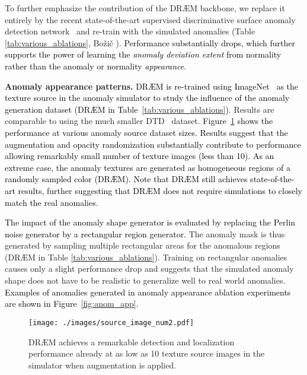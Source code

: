 \documentclass[10pt,twocolumn,letterpaper]{article}
\newcommand\ntxt[1]{\textcolor{black}{#1}}
\newcommand\ntext[1]{\textcolor{black}{#1}}
\begin{document}
To further emphasize the contribution of the DR{\AE}M backbone, we replace it entirely by the recent state-of-the-art supervised discriminative surface anomaly detection network~\cite{bozic2020end} and re-train with the simulated anomalies (Table \ref{tab:various_ablations}, Bo\v{z}i\v{c} \etal). \ntext{Performance substantially drops, which further supports the power of learning the \textit{anomaly deviation extent} from normality rather than the anomaly or normality \textit{appearance}.}





\textbf{Anomaly appearance patterns.} 
\ntext{DR{\AE}M is re-trained using ImageNet~\cite{deng2009imagenet} as the texture source in the anomaly simulator to study the influence of the anomaly generation dataset (DR{\AE}M in Table~\ref{tab:various_ablations}).} 
Results are comparable to using the much smaller DTD~\cite{cimpoi2014describing} dataset. \ntxt{Figure~\ref{fig:src_num} shows the performance at various anomaly source dataset sizes. Results suggest that the augmentation and opacity randomization substantially contribute to performance allowing remarkably small number of texture images (less than 10).} \ntext{As an extreme case, the anomaly textures are generated as homogeneous regions of a randomly sampled color (DR{\AE}M). Note that DR{\AE}M still achieves state-of-the-art results, further suggesting that DR{\AE}M does not require simulations to closely match the real anomalies.}

\ntext{The impact of the anomaly shape generator is evaluated by replacing the Perlin noise generator by a rectangular region generator.}
The anomaly mask is thus generated by sampling multiple rectangular areas for the anomalous regions (DR{\AE}M in Table \ref{tab:various_ablations}). Training on rectangular anomalies causes only a slight performance drop and suggests that the simulated anomaly shape does not have to be realistic to generalize well to real world anomalies. 
\ntext{Examples of anomalies generated in anomaly appearance ablation experiments are shown in Figure~\ref{fig:anom_app}.}

















\begin{figure}
\centering
  \texttt{[image: ./images/source\_image\_num2.pdf]}
\caption{DR{\AE}M achieves a remarkable detection and localization performance already at as low as 10 texture source images in the simulator when augmentation is applied.} 
\label{fig:src_num}
\end{figure}
\end{document}
